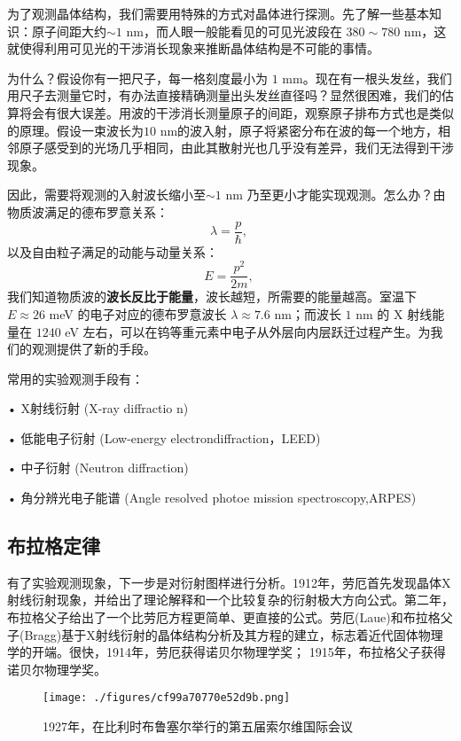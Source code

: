 
为了观测晶体结构，我们需要用特殊的方式对晶体进行探测。先了解一些基本知识：原子间距大约$\sim 1$ nm，而人眼一般能看见的可见光波段在 $380 \sim 780 $ nm，这就使得利用可见光的干涉消长现象来推断晶体结构是不可能的事情。

为什么？假设你有一把尺子，每一格刻度最小为 $1$ mm。现在有一根头发丝，我们用尺子去测量它时，有办法直接精确测量出头发丝直径吗？显然很困难，我们的估算将会有很大误差。用波的干涉消长测量原子的间距，观察原子排布方式也是类似的原理。假设一束波长为$10$ nm的波入射，原子将紧密分布在波的每一个地方，相邻原子感受到的光场几乎相同，由此其散射光也几乎没有差异，我们无法得到干涉现象。

因此，需要将观测的入射波长缩小至$\sim 1$ nm 乃至更小才能实现观测。怎么办？由物质波满足的德布罗意关系：
\begin{equation}
\lambda = \dfrac{p}{\hbar},~
\end{equation}
以及自由粒子满足的动能与动量关系：
\begin{equation}
E = \dfrac{p^2}{2 m},~
\end{equation}
我们知道物质波的\textbf{波长反比于能量}，波长越短，所需要的能量越高。室温下 $E \approx 26 $ meV 的电子对应的德布罗意波长 $\lambda \approx  7.6 $ nm；而波长 $1$ nm 的 X 射线能量在 $1240$ eV 左右，可以在钨等重元素中电子从外层向内层跃迁过程产生。为我们的观测提供了新的手段。

常用的实验观测手段有：

• X射线衍射 (X-ray diffractio n)

• 低能电子衍射 (Low-energy electrondiffraction，LEED)

• 中子衍射 (Neutron diffraction)

• 角分辨光电子能谱 (Angle resolved photoe mission spectroscopy,ARPES)

\subsection{布拉格定律}
有了实验观测现象，下一步是对衍射图样进行分析。1912年，劳厄首先发现晶体X射线衍射现象，并给出了理论解释和一个比较复杂的衍射极大方向公式。第二年，布拉格父子给出了一个比劳厄方程更简单、更直接的公式。劳厄(Laue)和布拉格父子(Bragg)基于X射线衍射的晶体结构分析及其方程的建立，标志着近代固体物理学的开端。很快，1914年，劳厄获得诺贝尔物理学奖； 1915年，布拉格父子获得诺贝尔物理学奖。

\begin{figure}[ht]
\centering
\texttt{[image: ./figures/cf99a70770e52d9b.png]}
\caption{1927年，在比利时布鲁塞尔举行的第五届索尔维国际会议} \label{fig_RecLat_1}
\end{figure}

